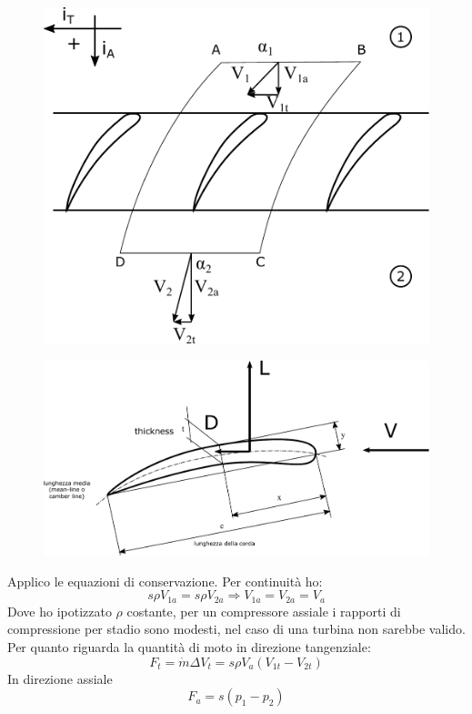 \begin{figure}[h!]
\centering
\begin{minipage}{.4\textwidth}
  \centering
  \includegraphics[width=.85\linewidth]{fig/schiera1.pdf}
  \label{}
\end{minipage}%
\begin{minipage}{.6\textwidth}
  \centering
  \includegraphics[width=.85\linewidth]{fig/LDref.pdf}
  \label{}
\end{minipage}
\end{figure}
Applico le equazioni di conservazione. Per continuità ho:
\begin{equation}
s \rho V_{1a} = s \rho V_{2a} \Rightarrow V_{1a} = V_{2a} = V_a
\end{equation}
Dove ho ipotizzato $\rho$ costante, per un compressore assiale i rapporti di compressione per stadio sono modesti, nel caso di una turbina non sarebbe valido. Per quanto riguarda la quantità di moto in direzione tangenziale:
\begin{equation}
F_t= \dot{m} \Delta V_t = s \rho	V_a (V_{1t}-V_{2t})
\end{equation}
In direzione assiale
\begin{equation}
F_a = s (p_1 - p_2)
\end{equation}

